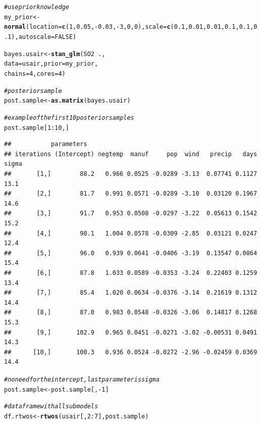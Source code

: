 \documentclass[11pt,a4paper,twoside]{book}
\makeatletter
\newcommand{\hlnum}[1]{\textcolor[rgb]{0.686,0.059,0.569}{#1}}%
\newcommand{\hlcom}[1]{\textcolor[rgb]{0.678,0.584,0.686}{\textit{#1}}}%
\newcommand{\hlopt}[1]{\textcolor[rgb]{0,0,0}{#1}}%
\newcommand{\hlstd}[1]{\textcolor[rgb]{0.345,0.345,0.345}{#1}}%
\newcommand{\hlkwb}[1]{\textcolor[rgb]{0.69,0.353,0.396}{#1}}%
\newcommand{\hlkwc}[1]{\textcolor[rgb]{0.333,0.667,0.333}{#1}}%
\newcommand{\hlkwd}[1]{\textcolor[rgb]{0.737,0.353,0.396}{\textbf{#1}}}%
\newenvironment{kframe}{%
 \def\at@end@of@kframe{}%
 \ifinner\ifhmode%
  \def\at@end@of@kframe{\end{minipage}}%
  \begin{minipage}{\columnwidth}%
 \fi\fi%
 \def\FrameCommand##1{\hskip\@totalleftmargin \hskip-\fboxsep
 \colorbox{shadecolor}{##1}\hskip-\fboxsep
     \hskip-\linewidth \hskip-\@totalleftmargin \hskip\columnwidth}%
 \MakeFramed {\advance\hsize-\width
   \@totalleftmargin\z@ \linewidth\hsize
   \@setminipage}}%
 {\par\unskip\endMakeFramed%
 \at@end@of@kframe}
\newenvironment{knitrout}{}{} %
\makeatother
\begin{document}
\begin{knitrout}
\begin{kframe}\begin{alltt}
\hlcom{#use prior knowledge}
\hlstd{my_prior} \hlkwb{<-} \hlkwd{normal}\hlstd{(}\hlkwc{location} \hlstd{=} \hlkwd{c}\hlstd{(}\hlnum{1}\hlstd{,} \hlnum{0.05}\hlstd{,}\hlopt{-}\hlnum{0.03}\hlstd{,}\hlopt{-}\hlnum{3}\hlstd{,} \hlnum{0}\hlstd{,} \hlnum{0}\hlstd{),} \hlkwc{scale} \hlstd{=} \hlkwd{c}\hlstd{(}\hlnum{0.1}\hlstd{,} \hlnum{0.01}\hlstd{,}\hlnum{0.01}\hlstd{,}\hlnum{0.1}\hlstd{,} \hlnum{0.1}\hlstd{,} \hlnum{0.1}\hlstd{),} \hlkwc{autoscale} \hlstd{=} \hlnum{FALSE}\hlstd{)}


\hlstd{bayes.usair} \hlkwb{<-} \hlkwd{stan_glm}\hlstd{(SO2} \hlopt{~} \hlstd{. ,}
                  \hlkwc{data} \hlstd{= usair,} \hlkwc{prior} \hlstd{= my_prior,}
                  \hlkwc{chains} \hlstd{=} \hlnum{4}\hlstd{,} \hlkwc{cores} \hlstd{=} \hlnum{4}\hlstd{)}

\hlcom{#posterior sample}
\hlstd{post.sample} \hlkwb{<-} \hlkwd{as.matrix}\hlstd{(bayes.usair)}

\hlcom{#example of the first 10 posterior samples}
\hlstd{post.sample[}\hlnum{1}\hlopt{:}\hlnum{10}\hlstd{,]}
\end{alltt}
\begin{verbatim}
##           parameters
## iterations (Intercept) negtemp  manuf     pop  wind   precip   days sigma
##       [1,]        88.2   0.966 0.0525 -0.0289 -3.13  0.07741 0.1127  13.1
##       [2,]        81.7   0.991 0.0571 -0.0289 -3.10  0.03120 0.1967  14.6
##       [3,]        91.7   0.953 0.0508 -0.0297 -3.22  0.05613 0.1542  15.2
##       [4,]        98.1   1.004 0.0578 -0.0309 -2.85  0.03121 0.0247  12.4
##       [5,]        96.0   0.939 0.0641 -0.0406 -3.19  0.13547 0.0864  15.4
##       [6,]        87.8   1.033 0.0589 -0.0353 -3.24  0.22403 0.1259  13.4
##       [7,]        85.4   1.020 0.0634 -0.0376 -3.14  0.21619 0.1312  14.4
##       [8,]        87.0   0.983 0.0548 -0.0326 -3.06  0.14817 0.1268  15.3
##       [9,]       102.9   0.965 0.0451 -0.0271 -3.02 -0.00531 0.0491  14.3
##      [10,]       100.3   0.936 0.0524 -0.0272 -2.96 -0.02459 0.0369  14.4
\end{verbatim}
\begin{alltt}
\hlcom{#no need for the intercept, last parameter is sigma}
\hlstd{post.sample} \hlkwb{<-} \hlstd{post.sample[,}\hlopt{-}\hlnum{1}\hlstd{]}

\hlcom{#data frame with all submodels}
\hlstd{df.rtwos} \hlkwb{<-}\hlkwd{rtwos}\hlstd{(usair[,}\hlnum{2}\hlopt{:}\hlnum{7}\hlstd{], post.sample)}



\end{alltt}
\end{kframe}
\end{knitrout}
\end{document}
